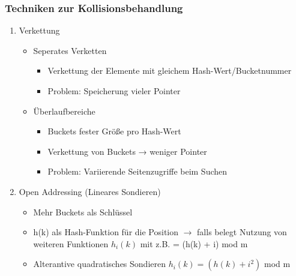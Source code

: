 \documentclass[a4paper]{article}
\begin{document}
    \subsubsection{Techniken zur Kollisionsbehandlung}
    \begin{enumerate}
        \item Verkettung
        
        \begin{itemize}
            \item Seperates Verketten
            \begin{itemize}
                \item Verkettung der Elemente mit gleichem Hash-Wert/Bucketnummer
                \item Problem: Speicherung vieler Pointer
            \end{itemize}
            
            \item Überlaufbereiche
            \begin{itemize}
                \item Buckets fester Größe pro Hash-Wert
                \item Verkettung von Buckets → weniger Pointer
                \item Problem: Variierende Seitenzugriffe beim Suchen
            \end{itemize}
        \end{itemize}
        
        \item Open Addressing (Lineares Sondieren)
        \begin{itemize}
            \item Mehr Buckets als Schlüssel
            \item h(k) als Hash-Funktion für die Position $\to$ falls belegt Nutzung von weiteren Funktionen $h_i(k)$ mit z.B. = (h(k) + i) mod m
            \item Alterantive quadratisches Sondieren $h_i(k) = (h(k) + i^2)$ mod m
        \end{itemize}
        

\end{enumerate}
\end{document}
